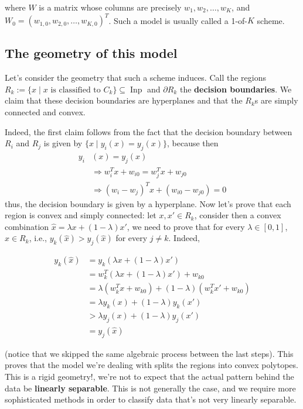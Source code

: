 \documentclass{report}
\DeclareMathOperator{\Inp}{Inp}
\begin{document}
where $W$ is a matrix whose columns are precisely $w_1, w_2,\dots, w_K$, and $W_0 = (w_{1,0}, w_{2,0},\dots, w_{K,0})^T$. Such a model is usually called a 1-of-$K$ scheme.

\subsection{The geometry of this model}

Let's consider the geometry that such a scheme induces. Call the regions $R_k := \{x\;|\;x \mbox{ is classified to } C_k\}\subseteq \Inp$ and $\partial R_k$ the \textbf{decision boundaries}. We claim that these decision boundaries are hyperplanes and that the $R_k$s are simply connected and convex.

Indeed, the first claim follows from the fact that the decision boundary between $R_i$ and $R_j$ is given by $\{x\;|\;y_i(x) = y_j(x)\}$, because then
\begin{align*}
y_i&(x) = y_j(x)\\
&\Rightarrow w_i^Tx + w_{i0} = w_j^Tx + w_{j0}\\
&\Rightarrow (w_i - w_j)^Tx + (w_{i0} - w_{j0}) = 0
\end{align*}
thus, the decision boundary is given by a hyperplane. Now let's prove that each region is convex and simply connected: let $x,x'\in R_k$, consider then a convex combination $\hat{x} = \lambda x + (1-\lambda)x'$, we need to prove that for every $\lambda\in [0,1]$, $\hat{x}\in R_k$, i.e., $y_k(\hat{x}) > y_j(\hat{x})$ for every $j\neq k$. Indeed,

\begin{align*}
 	y_k(\hat{x}) &= y_k(\lambda x + (1-\lambda)x')\\
 	&= w_k^T(\lambda x + (1-\lambda)x') + w_{k0}\\
 	&= \lambda(w_k^T x + w_{k0}) + (1-\lambda)(w_k^Tx' + w_{k0})\\
 	&= \lambda y_k(x) + (1-\lambda)y_k(x')\\
 	&> \lambda y_j(x) + (1-\lambda)y_j(x')\\
 	&= y_j(\hat{x})
 \end{align*}

(notice that we skipped the same algebraic process between the last steps). This proves that the model we're dealing with splits the regions into convex polytopes. This is a rigid geometry!, we're not to expect that the actual pattern behind the data be \textbf{linearly separable}. This is not generally the case, and we require more sophisticated methods in order to classify data that's not very linearly separable.
\end{document}
